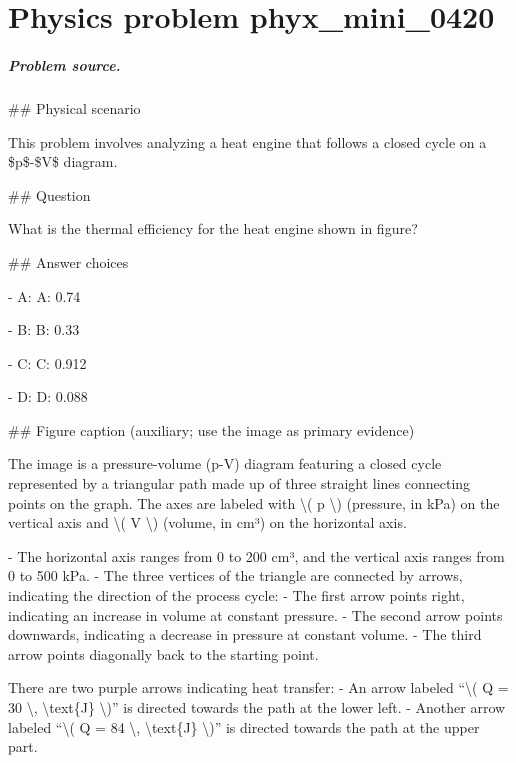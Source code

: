 
\chapter{Physics problem phyx\_mini\_0420}
\label{ch:PhyXMiniProblems_problem_phyx_mini_0420}

\paragraph{Problem source.}
\#\# Physical scenario

This problem involves analyzing a heat engine that follows a closed cycle on a \$p\$-\$V\$ diagram.

\#\# Question

What is the thermal efficiency for the heat engine shown in figure?

\#\# Answer choices

- A: A: 0.74

- B: B: 0.33

- C: C: 0.912

- D: D: 0.088

\#\# Figure caption (auxiliary; use the image as primary evidence)

The image is a pressure-volume (p-V) diagram featuring a closed cycle represented by a triangular path made up of three straight lines connecting points on the graph. The axes are labeled with \textbackslash{}( p \textbackslash{}) (pressure, in kPa) on the vertical axis and \textbackslash{}( V \textbackslash{}) (volume, in cm³) on the horizontal axis. 

- The horizontal axis ranges from 0 to 200 cm³, and the vertical axis ranges from 0 to 500 kPa.
- The three vertices of the triangle are connected by arrows, indicating the direction of the process cycle:
  - The first arrow points right, indicating an increase in volume at constant pressure.
  - The second arrow points downwards, indicating a decrease in pressure at constant volume.
  - The third arrow points diagonally back to the starting point.

There are two purple arrows indicating heat transfer:
- An arrow labeled “\textbackslash{}( Q = 30 \textbackslash{}, \textbackslash{}text\{J\} \textbackslash{})” is directed towards the path at the lower left.
- Another arrow labeled “\textbackslash{}( Q = 84 \textbackslash{}, \textbackslash{}text\{J\} \textbackslash{})” is directed towards the path at the upper part.

